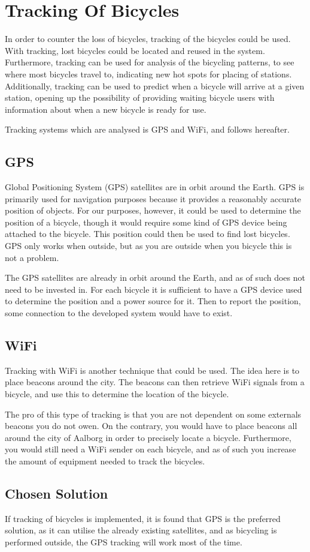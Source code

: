 \section{Tracking Of Bicycles}
In order to counter the loss of bicycles, tracking of the bicycles could be used.
With tracking, lost bicycles could be located and reused in the system.
Furthermore, tracking can be used for analysis of the bicycling patterns, to see where most bicycles travel to, indicating new hot spots for placing of stations.
Additionally, tracking can be used to predict when a bicycle will arrive at a given station, opening up the possibility of providing waiting bicycle users with information about when a new bicycle is ready for use.

Tracking systems which are analysed is GPS and WiFi, and follows hereafter.
\subsection{GPS}
Global Positioning System (GPS) satellites are in orbit around the Earth.
GPS is primarily used for navigation purposes because it provides a reasonably accurate position of objects.
For our purposes, however, it could be used to determine the position of a bicycle, though it would require some kind of GPS device being attached to the bicycle.
This position could then be used to find lost bicycles.
GPS only works when outside, but as you are outside when you bicycle this is not a problem.

The GPS satellites are already in orbit around the Earth, and as of such does not need to be invested in. %
For each bicycle it is sufficient to have a GPS device used to determine the position and a power source for it.
Then to report the position, some connection to the developed system would have to exist.

\subsection{WiFi}
Tracking with WiFi is another technique that could be used.
The idea here is to place beacons around the city.
The beacons can then retrieve WiFi signals from a bicycle, and use this to determine the location of the bicycle.

The pro of this type of tracking is that you are not dependent on some externals beacons you do not owen.
On the contrary, you would have to place beacons all around the city of Aalborg in order to precisely locate a bicycle.
Furthermore, you would still need a WiFi sender on each bicycle, and as of such you increase the amount of equipment needed to track the bicycles.

\subsection{Chosen Solution}
If tracking of bicycles is implemented, it is found that GPS is the preferred solution, as it can utilise the already existing satellites, and as bicycling is performed outside, the GPS tracking will work most of the time.